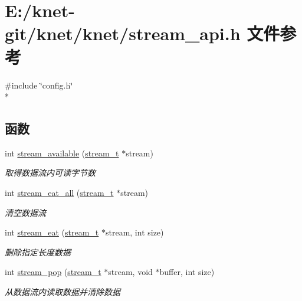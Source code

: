 \hypertarget{a00075}{}\section{E\+:/knet-\/git/knet/knet/stream\+\_\+api.h 文件参考}
\label{a00075}
{\ttfamily \#include \char`\"{}config.\+h\char`\"{}}\\*
\subsection*{函数}
\begin{DoxyCompactItemize}
\item 
int \hyperlink{a00088_ga6e109b2dc520782567dc1891af3b945e_ga6e109b2dc520782567dc1891af3b945e}{stream\+\_\+available} (\hyperlink{a00044_a261dba04f46f5c59a68a05f69f5a65a8_a261dba04f46f5c59a68a05f69f5a65a8}{stream\+\_\+t} $\ast$stream)
\begin{DoxyCompactList}\small\item\em 取得数据流内可读字节数 \end{DoxyCompactList}\item 
int \hyperlink{a00088_gaef7f4ca2c201faf5d82a1dad4c8d7814_gaef7f4ca2c201faf5d82a1dad4c8d7814}{stream\+\_\+eat\+\_\+all} (\hyperlink{a00044_a261dba04f46f5c59a68a05f69f5a65a8_a261dba04f46f5c59a68a05f69f5a65a8}{stream\+\_\+t} $\ast$stream)
\begin{DoxyCompactList}\small\item\em 清空数据流 \end{DoxyCompactList}\item 
int \hyperlink{a00088_ga1ab922f8bab979099b3abc3ee54dc59d_ga1ab922f8bab979099b3abc3ee54dc59d}{stream\+\_\+eat} (\hyperlink{a00044_a261dba04f46f5c59a68a05f69f5a65a8_a261dba04f46f5c59a68a05f69f5a65a8}{stream\+\_\+t} $\ast$stream, int size)
\begin{DoxyCompactList}\small\item\em 删除指定长度数据 \end{DoxyCompactList}\item 
int \hyperlink{a00088_ga6e01758abf49f8b08cd457f1cb48a954_ga6e01758abf49f8b08cd457f1cb48a954}{stream\+\_\+pop} (\hyperlink{a00044_a261dba04f46f5c59a68a05f69f5a65a8_a261dba04f46f5c59a68a05f69f5a65a8}{stream\+\_\+t} $\ast$stream, void $\ast$buffer, int size)
\begin{DoxyCompactList}\small\item\em 从数据流内读取数据并清除数据 \end{DoxyCompactList}\item 

\end{DoxyCompactItemize}
